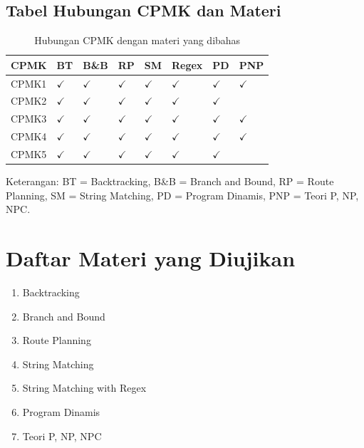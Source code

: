 \documentclass[11pt,a4paper]{article}
\begin{document}
\subsection{Tabel Hubungan CPMK dan Materi}

\begin{table}[H]
    \centering
    \small
    \begin{tabularx}{\textwidth}{|L{0.14\textwidth}|*{7}{>{\centering\arraybackslash}X|}}
        \hline
        \textbf{CPMK} & \textbf{BT} & \textbf{B\&B} & \textbf{RP} & \textbf{SM} & \textbf{Regex} & \textbf{PD} & \textbf{PNP} \\
        \hline
        CPMK1 & $\checkmark$ & $\checkmark$ & $\checkmark$ & $\checkmark$ & $\checkmark$ & $\checkmark$ & $\checkmark$ \\
        \hline
        CPMK2 & $\checkmark$ & $\checkmark$ & $\checkmark$ & $\checkmark$ & $\checkmark$ & $\checkmark$ &  \\
        \hline
        CPMK3 & $\checkmark$ & $\checkmark$ & $\checkmark$ & $\checkmark$ & $\checkmark$ & $\checkmark$ & $\checkmark$ \\
        \hline
        CPMK4 & $\checkmark$ & $\checkmark$ & $\checkmark$ & $\checkmark$ & $\checkmark$ & $\checkmark$ & $\checkmark$ \\
        \hline
        CPMK5 & $\checkmark$ & $\checkmark$ & $\checkmark$ & $\checkmark$ & $\checkmark$ & $\checkmark$ &  \\
        \hline
    \end{tabularx}
    \caption{Hubungan CPMK dengan materi yang dibahas}
    \label{tab:hubungan-cpmk-materi}
\end{table}

\noindent
Keterangan: BT = Backtracking, B\&B = Branch and Bound, RP = Route Planning,
SM = String Matching, PD = Program Dinamis, PNP = Teori P, NP, NPC.

\section{Daftar Materi yang Diujikan}

\begin{enumerate}
    \item Backtracking
    \item Branch and Bound
    \item Route Planning
    \item String Matching
    \item String Matching with Regex
    \item Program Dinamis
    \item Teori P, NP, NPC
\end{enumerate}
\end{document}
